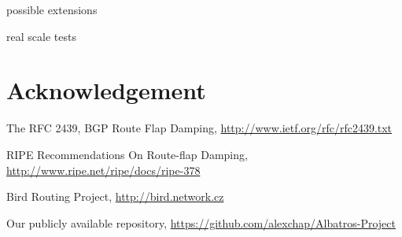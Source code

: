 \documentclass[a4paper,english]{IEEEtran}
\begin{document}
possible extensions

real scale tests


\section{Acknowledgement}
\begin{thebibliography}{4}
The RFC 2439, BGP Route Flap Damping, \href{http://www.ietf.org/rfc/rfc2439.txt}{http://www.ietf.org/rfc/rfc2439.txt}

 RIPE Recommendations On Route-flap
Damping, \href{http://www.ripe.net/ripe/docs/ripe-378}{http://www.ripe.net/ripe/docs/ripe-378}

Bird Routing Project, \href{http://bird.network.cz}{http://bird.network.cz}

Our publicly available repository, \href{https://github.com/alexchap/Albatros-Project}{https://github.com/alexchap/Albatros-Project}
\end{thebibliography}
\end{document}

